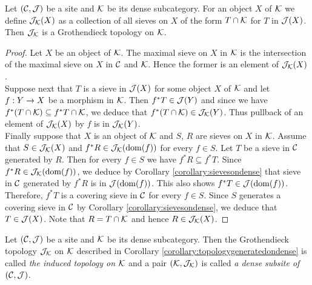 \begin{corollary}\label{corollary:topologygeneratedondense}
Let $({\mathcal C}, {\mathcal J})$ be a site and ${\mathcal K}$ be its dense subcategory. For an object $X$ of ${\mathcal K}$ we define ${\mathcal J}_{{\mathcal K}}(X)$ as a collection of all sieves on $X$ of the form $T\cap {\mathcal K}$ for $T$ in ${\mathcal J}(X)$. Then ${\mathcal J}_{{\mathcal K}}$ is a Grothendieck topology on ${\mathcal K}$.
\end{corollary}
\begin{proof}
Let $X$ be an object of ${\mathcal K}$. The maximal sieve on $X$ in ${\mathcal K}$ is the intersection of the maximal sieve on $X$ in ${\mathcal C}$ and ${\mathcal K}$. Hence the former is an element of ${\mathcal J}_{{\mathcal K}}(X)$.\\
Suppose next that $T$ is a sieve in ${\mathcal J}(X)$ for some object $X$ of ${\mathcal K}$ and let $f:Y\rightarrow X$ be a morphism in ${\mathcal K}$. Then $f^*T\in {\mathcal J}(Y)$ and since we have $f^*(T\cap {\mathcal K}) \subseteq f^*T\cap {\mathcal K}$, we deduce that $f^*(T\cap {\mathcal K})\in {\mathcal J}_{{\mathcal K}}(Y)$. Thus pullback of an element of ${\mathcal J}_{{\mathcal K}}(X)$ by $f$ is in ${\mathcal J}_{{\mathcal K}}(Y)$.\\
Finally suppose that $X$ is an object of ${\mathcal K}$ and $S$, $R$ are sieves on $X$ in ${\mathcal K}$. Assume that $S\in {\mathcal J}_{{\mathcal K}}(X)$ and $f^*R\in {\mathcal J}_{{\mathcal K}}(\mathrm{dom}(f))$ for every $f\in S$. Let $T$ be a sieve in ${\mathcal C}$ generated by $R$. Then for every $f\in S$ we have $f^*R\subseteq f^*T$. Since $f^*R\in {\mathcal J}_{{\mathcal K}}(\mathrm{dom}(f))$, we deduce by Corollary \ref{corollary:sievesondense} that sieve in ${\mathcal C}$ generated by $f^*R$ is in ${\mathcal J}(\mathrm{dom}(f))$. This also shows $f^*T \in {\mathcal J}(\mathrm{dom}(f))$. Therefore, $f^*T$ is a covering sieve in ${\mathcal C}$ for every $f\in S$. Since $S$ generates a covering sieve in ${\mathcal C}$ by Corollary \ref{corollary:sievesondense}, we deduce that $T\in {\mathcal J}(X)$. Note that $R = T\cap {\mathcal K}$ and hence $R\in {\mathcal J}_{{\mathcal K}}(X)$.
\end{proof}

\begin{definition}
Let $({\mathcal C},{\mathcal J})$ be a site and ${\mathcal K}$ be its dense subcategory. Then the Grothendieck topology ${\mathcal J}_{{\mathcal K}}$ on ${\mathcal K}$ described in Corollary \ref{corollary:topologygeneratedondense} is called \textit{the induced topology on ${\mathcal K}$} and a pair $({\mathcal K},{\mathcal J}_{{\mathcal K}})$ is called \textit{a dense subsite of $({\mathcal C},{\mathcal J})$}.
\end{definition}


